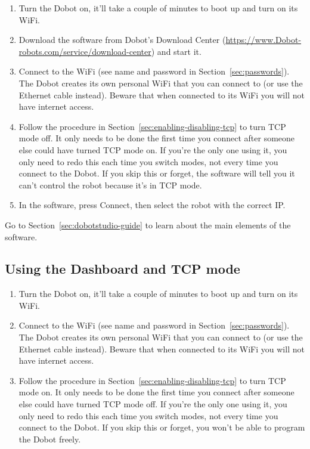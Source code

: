 \documentclass[11pt,a4paper]{article}
\begin{document}
\begin{enumerate}[leftmargin=1.2cm]
    \item Turn the Dobot on, it'll take a couple of minutes to boot up and turn on its WiFi.
    \item Download the software from Dobot's Download Center (\url{https://www.Dobot-robots.com/service/download-center}) and start it.
    \item Connect to the WiFi (see name and password in Section~\ref{sec:passwords}). The Dobot creates its own personal WiFi that you can connect to (or use the Ethernet cable instead). Beware that when connected to its WiFi you will not have internet access.
    \item Follow the procedure in Section~\ref{sec:enabling-disabling-tcp} to turn TCP mode off. It only needs to be done the first time you connect after someone else could have turned TCP mode on. If you're the only one using it, you only need to redo this each time you switch modes, not every time you connect to the Dobot. If you skip this or forget, the software will tell you it can't control the robot because it's in TCP mode.
    \item In the software, press Connect, then select the robot with the correct IP.
\end{enumerate}

%

Go to Section~\ref{sec:dobotstudio-guide} to learn about the main elements of the software.

\subsection{Using the Dashboard and TCP mode}
\label{sec:connecting-dashboard}

\begin{enumerate}[leftmargin=1.2cm]
    \item Turn the Dobot on, it'll take a couple of minutes to boot up and turn on its WiFi.
    \item Connect to the WiFi (see name and password in Section~\ref{sec:passwords}). The Dobot creates its own personal WiFi that you can connect to (or use the Ethernet cable instead). Beware that when connected to its WiFi you will not have internet access.
    \item Follow the procedure in Section~\ref{sec:enabling-disabling-tcp} to turn TCP mode on. It only needs to be done the first time you connect after someone else could have turned TCP mode off. If you're the only one using it, you only need to redo this each time you switch modes, not every time you connect to the Dobot. If you skip this or forget, you won't be able to program the Dobot freely.
\end{enumerate}
\end{document}
